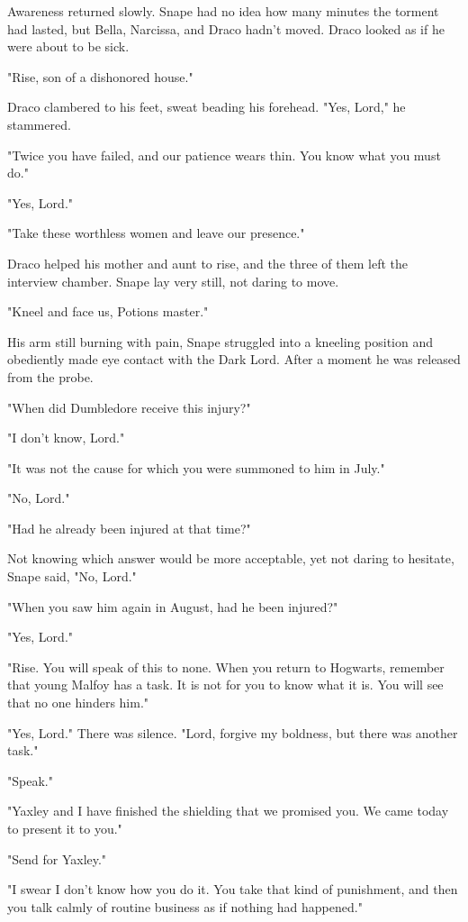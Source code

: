 Awareness returned slowly. Snape had no idea how many minutes the torment had lasted, but Bella, Narcissa, and Draco hadn't moved. Draco looked as if he were about to be sick.

"Rise, son of a dishonored house."

Draco clambered to his feet, sweat beading his forehead. "Yes, Lord," he stammered.

"Twice you have failed, and our patience wears thin. You know what you must do."

"Yes, Lord."

"Take these worthless women and leave our presence."

Draco helped his mother and aunt to rise, and the three of them left the interview chamber. Snape lay very still, not daring to move.

"Kneel and face us, Potions master."

His arm still burning with pain, Snape struggled into a kneeling position and obediently made eye contact with the Dark Lord. After a moment he was released from the probe.

"When did Dumbledore receive this injury?"

"I don't know, Lord."

"It was not the cause for which you were summoned to him in July."

"No, Lord."

"Had he already been injured at that time?"

Not knowing which answer would be more acceptable, yet not daring to hesitate, Snape said, "No, Lord."

"When you saw him again in August, had he been injured?"

"Yes, Lord."

"Rise. You will speak of this to none. When you return to Hogwarts, remember that young Malfoy has a task. It is not for you to know what it is. You will see that no one hinders him."

"Yes, Lord." There was silence. "Lord, forgive my boldness, but there was another task."

"Speak."

"Yaxley and I have finished the shielding that we promised you. We came today to present it to you."

"Send for Yaxley."

\sbreak

"I swear I don't know how you do it. You take that kind of punishment, and then you talk calmly of routine business as if nothing had happened."

